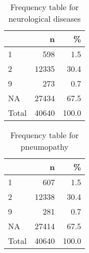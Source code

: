 \documentclass[
]{article}
\newenvironment{Shaded}{\begin{snugshade}}{\end{snugshade}}
\newcommand{\DataTypeTok}[1]{\textcolor[rgb]{0.13,0.29,0.53}{#1}}
\newcommand{\DecValTok}[1]{\textcolor[rgb]{0.00,0.00,0.81}{#1}}
\newcommand{\KeywordTok}[1]{\textcolor[rgb]{0.13,0.29,0.53}{\textbf{#1}}}
\newcommand{\NormalTok}[1]{#1}
\newcommand{\OperatorTok}[1]{\textcolor[rgb]{0.81,0.36,0.00}{\textbf{#1}}}
\newcommand{\OtherTok}[1]{\textcolor[rgb]{0.56,0.35,0.01}{#1}}
\newcommand{\StringTok}[1]{\textcolor[rgb]{0.31,0.60,0.02}{#1}}
\begin{document}
\begin{table}[!h]

\caption{\label{tab:unnamed-chunk-34}Frequency table for neurological diseases}
\centering
\begin{tabular}[t]{l|r|r}
\hline
  & n & \%\\
\hline
1 & 598 & 1.5\\
\hline
2 & 12335 & 30.4\\
\hline
9 & 273 & 0.7\\
\hline
NA & 27434 & 67.5\\
\hline
Total & 40640 & 100.0\\
\hline
\end{tabular}
\end{table}

\begin{Shaded}
\end{Shaded}

\begin{table}[!h]

\caption{\label{tab:unnamed-chunk-35}Frequency table for pneumopathy}
\centering
\begin{tabular}[t]{l|r|r}
\hline
  & n & \%\\
\hline
1 & 607 & 1.5\\
\hline
2 & 12338 & 30.4\\
\hline
9 & 281 & 0.7\\
\hline
NA & 27414 & 67.5\\
\hline
Total & 40640 & 100.0\\
\hline
\end{tabular}
\end{table}
\end{document}
